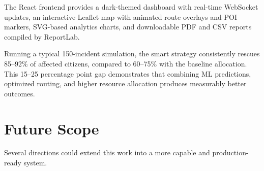 The React frontend provides a dark-themed dashboard with real-time WebSocket updates, an interactive Leaflet map with animated route overlays and POI markers, SVG-based analytics charts, and downloadable PDF and CSV reports compiled by ReportLab.

Running a typical 150-incident simulation, the smart strategy consistently rescues 85--92\% of affected citizens, compared to 60--75\% with the baseline allocation. This 15--25 percentage point gap demonstrates that combining ML predictions, optimized routing, and higher resource allocation produces measurably better outcomes.

\section{Future Scope}
\label{sec:future_scope}

Several directions could extend this work into a more capable and production-ready system.

